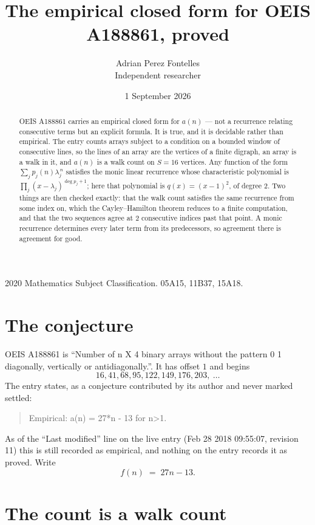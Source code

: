 \documentclass[11pt,a4paper]{article}
\title{The empirical closed form for OEIS A188861, proved}
\author{Adrian Perez Fontelles\\ \small Independent researcher}
\date{1 September 2026}
\theoremstyle{plain}
\theoremstyle{definition}
\begin{document}
\maketitle

\begin{abstract}
OEIS A188861 carries an empirical closed form for $a(n)$ --- not a recurrence relating
consecutive terms but an explicit formula. It is true, and it is decidable rather than
empirical. The entry counts arrays subject to a condition on a bounded window of consecutive lines, so the lines of an array are the
vertices of a finite digraph, an array is a walk in it, and $a(n)$ is a walk count on
$S=16$ vertices. Any function of the form $\sum_j p_j(n)\lambda_j^{\,n}$ satisfies the
monic linear recurrence whose characteristic polynomial is
$\prod_j(x-\lambda_j)^{\deg p_j+1}$; here that polynomial is $q(x)=(x-1)^{2}$, of degree
$2$. Two things are then checked exactly: that the walk count satisfies the same
recurrence from some index on, which the Cayley--Hamilton theorem reduces to a finite
computation, and that the two sequences agree at $2$ consecutive indices past that
point. A monic recurrence determines every later term from its predecessors, so agreement
there is agreement for good.
\end{abstract}

\noindent\small 2020 Mathematics Subject Classification. 05A15, 11B37, 15A18.\normalsize

\section{The conjecture}

OEIS A188861 is ``Number of n X 4 binary arrays without the pattern 0 1 diagonally, vertically or antidiagonally.''. It has offset $1$ and begins
\[
16, 41, 68, 95, 122, 149, 176, 203,\ \dots
\]
The entry states, as a conjecture contributed by its author and never marked settled:
\begin{quote}
Empirical: a(n) = 27*n - 13 for n>1.
\end{quote}
As of the ``Last modified'' line on the live entry (Feb 28 2018 09:55:07, revision 11) this is still
recorded as empirical, and nothing on the entry records it as proved. Write
\[
f(n)\;=\;27 n - 13.
\]

\section{The count is a walk count}
\end{document}

